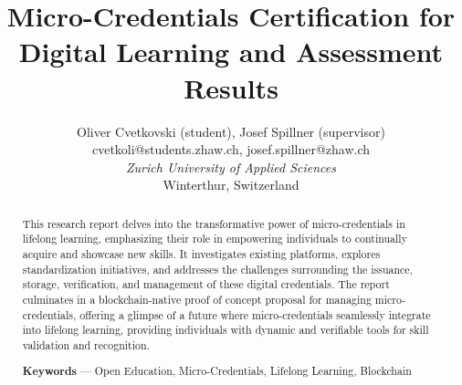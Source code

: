 \documentclass{article}
\title{Micro-Credentials Certification for Digital Learning and Assessment Results}
\author{
    Oliver Cvetkovski (student), Josef Spillner (supervisor) \\
    cvetkoli@students.zhaw.ch, josef.spillner@zhaw.ch \\
    \textit{Zurich University of Applied Sciences} \\
    Winterthur, Switzerland
}
\begin{document}
\maketitle

\begin{abstract}
    This research report delves into the transformative power of micro-credentials in lifelong learning, emphasizing their role in empowering individuals to continually acquire and showcase new skills. It investigates existing platforms, explores standardization initiatives, and addresses the challenges surrounding the issuance, storage, verification, and management of these digital credentials. The report culminates in a blockchain-native proof of concept proposal for managing micro-credentials, offering a glimpse of a future where micro-credentials seamlessly integrate into lifelong learning, providing individuals with dynamic and verifiable tools for skill validation and recognition.

    \vspace{.15cm} \textbf{Keywords} --- Open Education, Micro-Credentials, Lifelong Learning, Blockchain

\end{abstract}
\end{document}
